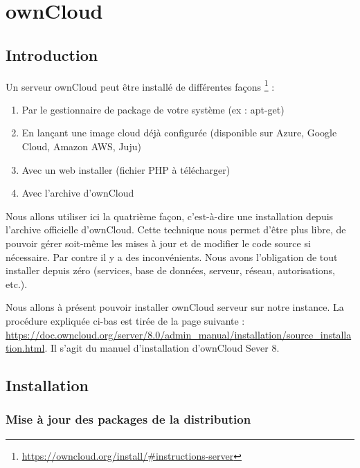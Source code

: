 \chapter{ownCloud}
\section{Introduction}

\noindent Un serveur ownCloud peut être installé de différentes façons \footnote{\url{https://owncloud.org/install/\#instructions-server}} :

\begin{enumerate}
 \item Par le gestionnaire de package de votre système (ex : apt-get)
 \item En lançant une image cloud déjà configurée (disponible sur Azure, Google Cloud, Amazon AWS, Juju)
 \item Avec un web installer (fichier PHP à télécharger)
 \item Avec l'archive d'ownCloud
\end{enumerate}


Nous allons utiliser ici la quatrième façon, c'est-à-dire une installation depuis l'archive officielle d'ownCloud. Cette technique nous permet d'être plus libre, de pouvoir gérer soit-même les mises à jour et de modifier le code source si nécessaire. Par contre il y a des inconvénients. Nous avons l'obligation de tout installer depuis zéro (services, base de données, serveur, réseau, autorisations, etc.).

Nous allons à présent pouvoir installer ownCloud serveur sur notre instance. La procédure expliquée ci-bas est tirée de la page suivante : 
\url{https://doc.owncloud.org/server/8.0/admin_manual/installation/source_installation.html}. Il s'agit du manuel d'installation d'ownCloud Sever 8.

\section{Installation}

\subsection{Mise à jour des packages de la distribution}

